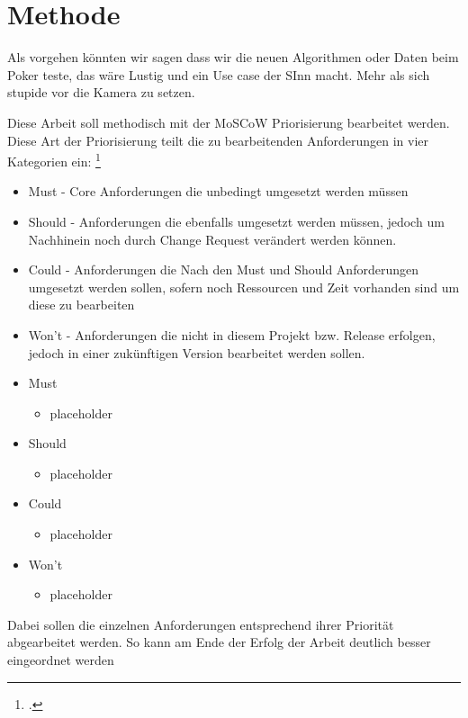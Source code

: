 \documentclass[12pt, a4paper]{scrbook}
\begin{document}
\chapter{Methode}

Als vorgehen könnten wir sagen dass wir die neuen Algorithmen oder Daten beim Poker teste, das wäre Lustig und ein Use case der SInn macht. Mehr als sich stupide vor die Kamera zu setzen.

Diese Arbeit soll methodisch mit der MoSCoW Priorisierung bearbeitet werden. Diese Art der Priorisierung teilt die zu bearbeitenden Anforderungen in vier Kategorien ein:
\footcite[vgl.][90]{Projektmanagement}
\begin{itemize}
\item Must - Core Anforderungen die unbedingt umgesetzt werden müssen
\item Should - Anforderungen die ebenfalls umgesetzt werden müssen, jedoch um Nachhinein noch durch Change Request verändert werden können.
\item Could - Anforderungen die Nach den Must und Should Anforderungen umgesetzt werden sollen, sofern noch Ressourcen und Zeit vorhanden sind um diese zu bearbeiten
\item Won't - Anforderungen die nicht in diesem Projekt bzw. Release erfolgen, jedoch in einer zukünftigen Version bearbeitet werden sollen. 
\end{itemize}


\begin{itemize}
\item Must
\begin{itemize}
\item placeholder
\end{itemize}
\item Should
\begin{itemize}
\item placeholder
\end{itemize}
\item Could
\begin{itemize}
\item placeholder
\end{itemize}
\item Won't
\begin{itemize}
\item placeholder
\end{itemize}
\end{itemize}
Dabei sollen die einzelnen Anforderungen entsprechend ihrer Priorität abgearbeitet werden. So kann am Ende der Erfolg der Arbeit deutlich besser eingeordnet werden
\end{document}
